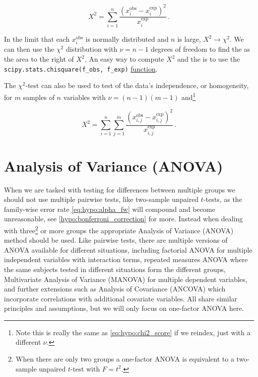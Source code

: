 \begin{equation}\label{eq:hypo:chi2_score}
X^{2} = \sum_{i=1}^{n} \frac{\left(x^{\text{obs}}_{i} - x^{\text{exp}}_{i}\right)^{2}}{x^{\text{exp}}_{i}}\,.
\end{equation}

In the limit that each $x^{\text{obs}}_{i}$ is normally distributed and $n$ is large, $X^{2} \to \chi^{2}$.
We can then use the $\chi^{2}$ distribution with $\nu = n-1$ degrees of freedom to find the \pvalue as the area to the right of $X^{2}$.
An easy way to compute $X^{2}$ and the \pvalue is to use the \texttt{scipy.stats.chisquare(f\_obs, f\_exp)}
\href{https://docs.scipy.org/doc/scipy/reference/generated/scipy.stats.chisquare.html}{function}.

The $\chi^{2}$-test can also be used to test of the data's independence, or homogeneity,
for $m$ samples of $n$ variables with $\nu = \left(n-1\right)\left(m-1\right)$ and\footnote{Note this is really the same as \cref{eq:hypo:chi2_score} if we reindex, just with a different $\nu$.}

\begin{equation}\label{eq:hypo:chi2_score_ind}
X^{2} = \sum_{i=1}^{n} \sum_{j=1}^{m} \frac{\left(x^{\text{obs}}_{i,j} - x^{\text{exp}}_{i,j}\right)^{2}}{x^{\text{exp}}_{i,j}}\,.
\end{equation}

\section{Analysis of Variance (ANOVA)}
\label{hypo:ANOVA}

When we are tasked with testing for differences between multiple groups
we should not use multiple pairwise tests, like two-sample unpaired $t$-tests,
as the family-wise error rate \cref{eq:hypo:alpha_fw}
will compound and become unreasonable, see \cref{hypo:bonferroni_correction} for more.
Instead when dealing with three\footnote{When there are only two groups a one-factor ANOVA is equivalent to a two-sample unpaired $t$-test with $F=t^{2}$.} or more groups
the appropriate Analysis of Variance (ANOVA) method should be used.
Like pairwise tests, there are multiple versions of ANOVA available for different situations, including
factorial ANOVA for multiple independent variables with interaction terms,
repeated measures ANOVA where the same subjects tested in different situations form the different groups,
Multivariate Analysis of Variance (MANOVA) for multiple dependent variables,
and further extensions such as Analysis of Covariance (ANCOVA) which incorporate correlations with additional covariate variables.
All share similar principles and assumptions,
but we will only focus on one-factor ANOVA here.

